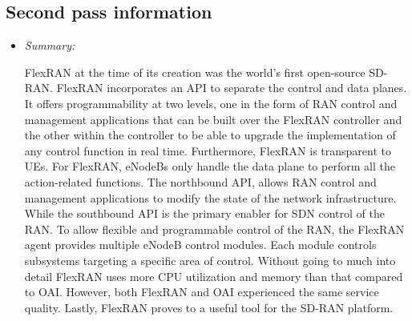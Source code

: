 \documentclass[letterpaper,twocolumn,10pt]{article}
\begin{document}
\subsection{Second pass information}
\label{sec:second}

\begin{itemize}
\item {\it Summary:}

FlexRAN at the time of its creation was the world's first open-source SD-RAN. FlexRAN incorporates an API to 
separate the control and data planes. It offers programmability at two levels, one in the form of RAN control and 
management applications that can be built over the FlexRAN controller and the other within the controller to be 
able to upgrade the implementation of any control function in real time. Furthermore, FlexRAN is transparent to
UEs. For FlexRAN, eNodeBs only handle the data plane to perform all the action-related functions. The northbound
API, allows RAN control and management applications to modify the state of the network infrastructure. While the 
southbound API is the primary enabler for SDN control of the RAN. To allow flexible and programmable control of the
RAN, the FlexRAN agent provides multiple eNodeB control modules. Each module controls subsystems targeting a
specific area of control. Without going to much into detail FlexRAN uses more CPU utilization and memory than that
compared to OAI. However, both FlexRAN and OAI experienced the same service quality. Lastly, FlexRAN proves to 
a useful tool for the SD-RAN platform. 

\end{itemize}
\end{document}
